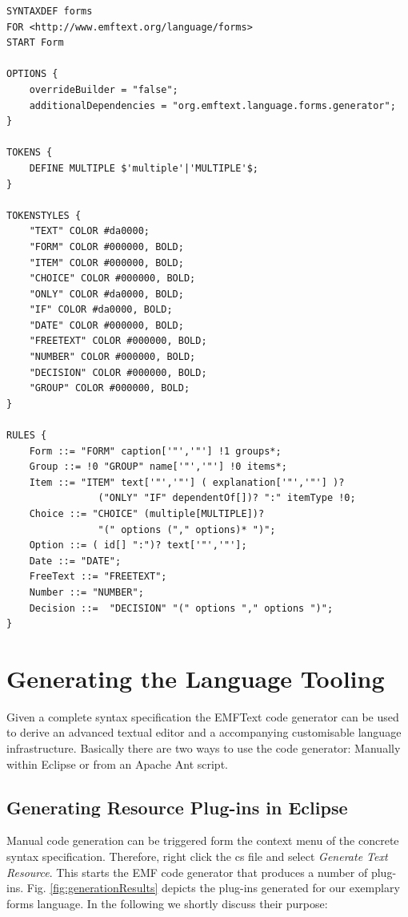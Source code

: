  \lstset{language=cs}
	\begin{lstlisting}[label=lst:formsCs, caption=Concrete syntax specification for
	the exemplary forms language written in the cs-language] 
SYNTAXDEF forms
FOR <http://www.emftext.org/language/forms>
START Form

OPTIONS {
	overrideBuilder = "false";
	additionalDependencies = "org.emftext.language.forms.generator";
}

TOKENS {
	DEFINE MULTIPLE $'multiple'|'MULTIPLE'$;
}

TOKENSTYLES {
	"TEXT" COLOR #da0000;
	"FORM" COLOR #000000, BOLD;
	"ITEM" COLOR #000000, BOLD;
	"CHOICE" COLOR #000000, BOLD;
	"ONLY" COLOR #da0000, BOLD;
	"IF" COLOR #da0000, BOLD;
	"DATE" COLOR #000000, BOLD;
	"FREETEXT" COLOR #000000, BOLD;
	"NUMBER" COLOR #000000, BOLD;
	"DECISION" COLOR #000000, BOLD;
	"GROUP" COLOR #000000, BOLD;
}
  
RULES {
	Form ::= "FORM" caption['"','"'] !1 groups*;
	Group ::= !0 "GROUP" name['"','"'] !0 items*;
	Item ::= "ITEM" text['"','"'] ( explanation['"','"'] )? 
				("ONLY" "IF" dependentOf[])? ":" itemType !0;
	Choice ::= "CHOICE" (multiple[MULTIPLE])? 
				"(" options ("," options)* ")";
	Option ::= ( id[] ":")? text['"','"'];
	Date ::= "DATE";
	FreeText ::= "FREETEXT";
	Number ::= "NUMBER";
	Decision ::=  "DECISION" "(" options "," options ")"; 
}

	\end{lstlisting} 
 


\section{Generating the Language Tooling}
\label{sec:process_generating}
	Given a complete syntax specification the EMFText code generator can be used to
	derive an advanced textual editor and a accompanying customisable
	language infrastructure. Basically there are two ways to use the code
	generator: Manually within Eclipse or from an Apache Ant script.


	\subsection{Generating Resource Plug-ins in Eclipse}
	Manual code generation can be triggered form the context menu of the concrete
	syntax specification. Therefore, right click the cs file and select
	\emph{Generate Text Resource}. This starts the EMF code generator that produces
	a number of plug-ins. Fig. \ref{fig:generationResults} depicts the plug-ins
	generated for our exemplary forms language. In the following we shortly discuss
	their purpose:
	
